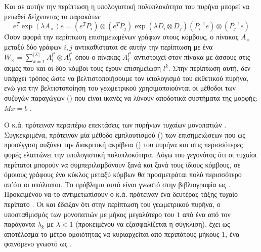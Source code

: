 Και σε αυτήν την περίπτωση η υπολογιστική πολυπλοκότητα του πυρήνα μπορεί να μειωθεί δείχνοντας το παρακάτω:
\begin{equation}
    e^T\exp(\lambda A_{\times}) e = (e^T P_{i}) \otimes (e^T P_{j})\exp(\lambda D_{i} \otimes D_{j}) (P_{i}^{-1} e) \otimes (P_{j}^{-1} e)
\end{equation}
Όσον αφορά την περίπτωση επισημειωμένων γράφων στους κόμβους, ο πίνακας $Α_{\times}$ μεταξύ δύο γράφων $i, j$ αντικαθίσταται σε αυτήν την περίπτωση με ένα $W_{\times} = \sum_{k=1}^{|\Sigma|}A_{i}^{l^{k}}\otimes A_{j}^{l^{k}}$ όπου ο πίνακας $A_{i}^{l^{k}}$ αντιστοιχεί στον πίνακα με άσσους στις ακμές που και οι δύο κόμβοι τους έχουν επισημείωση $l^{k}$.
Στην περίπτωση αυτή, δεν υπάρχει τρόπος ώστε να βελτιστοποιήσουμε τον υπολογισμό του εκθετικού πυρήνα, ενώ για την βελτιστοποίηση του γεωμετρικού χρησιμοποιούνται οι μέθοδοι των συζυγών παραγώγων () που είναι ικανές να λύνουν αποδοτικά συστήματα της μορφής: $Mx = b$ \cite{cgm}.\par
Ο  κ.ά. πρότειναν περαιτέρω επεκτάσεις των πυρήνων τυχαίων μονοπατιών \cite{mahe2004extensions}.
Συγκεκριμένα, πρότειναν μία μέθοδο εμπλουτισμού () των επισημειώσεων που ως προσέγγιση αυξάνει την διακριτική ακρίβεια () του πυρήνα και στις περισσότερες φορές ελαττώνει την υπολογιστική πολυπλοκότητα.
Λόγω του γεγονότος ότι οι τυχαίοι περίπατοι μπορούν να συμπεριλαμβάνουν ξανά και ξανά τους ίδιους κόμβους, σε όμοιους γράφους ένα κύκλος μεταξύ κόμβων θα προσμετράται πολύ περισσότερο απ'ότι οι υπόλοιποι. Το πρόβλημα αυτό είναι γνωστό στην βιβλιογραφία ως .
Προκειμένου να το αντιμετωπίσουν ο  κ.ά. πρότειναν ένα δευτέρας τάξης τυχαίο περίπατο .
Οι  και  έδειξαν ότι στην περίπτωση του γεωμετρικού πυρήνα, ο υποσταθμισμός των μονοπατιών με μήκος μεγαλύτερο του $1$ από ένα από τον παράγοντα $λ_{k}$ με $λ<1$ (προκειμένου να εξασφαλίζεται η σύγκλιση), έχει ως αποτέλεσμα το μέτρο ομοιότητας να κυριαρχείται από περιπάτους μήκους $1$, ένα φαινόμενο γνωστό ως  \cite{sugiyama2015halting}.

